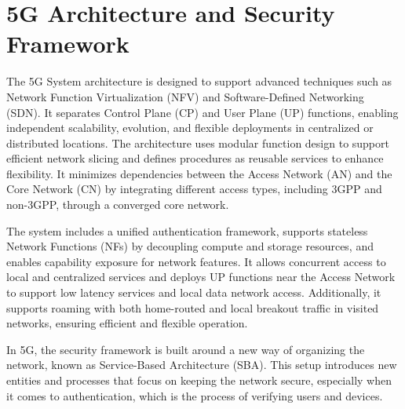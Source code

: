 \section{\acs{5G} Architecture and Security Framework}

The 5G System architecture is designed to support advanced techniques such as Network Function Virtualization (NFV) and Software-Defined Networking (SDN). It separates Control Plane (CP) and User Plane (UP) functions, enabling independent scalability, evolution, and flexible deployments in centralized or distributed locations. The architecture uses modular function design to support efficient network slicing and defines procedures as reusable services to enhance flexibility. It minimizes dependencies between the Access Network (AN) and the Core Network (CN) by integrating different access types, including 3GPP and non-3GPP, through a converged core network.

The system includes a unified authentication framework, supports stateless Network Functions (NFs) by decoupling compute and storage resources, and enables capability exposure for network features. It allows concurrent access to local and centralized services and deploys UP functions near the Access Network to support low latency services and local data network access. Additionally, it supports roaming with both home-routed and local breakout traffic in visited networks, ensuring efficient and flexible operation.%

In 5G, the security framework is built around a new way of organizing the network, known as Service-Based Architecture (SBA). This setup introduces new entities and processes that focus on keeping the network secure, especially when it comes to authentication, which is the process of verifying users and devices.

